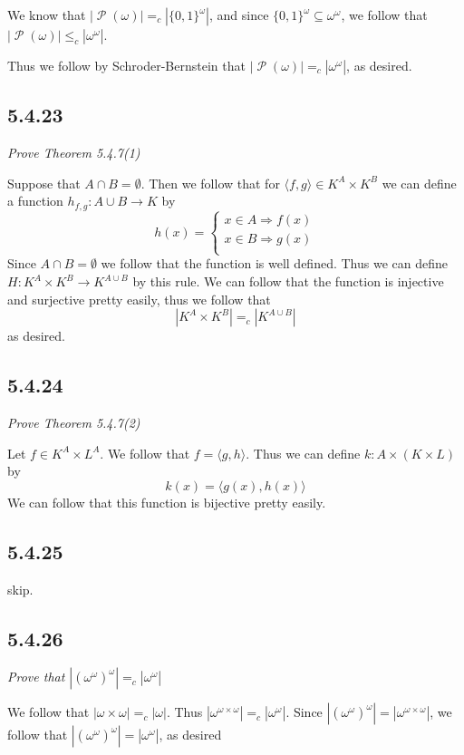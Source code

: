 \documentclass[11pt,oneside,titlepage]{book}
\DeclareMathOperator \pow {\mathcal {P}}
\DeclareMathOperator \ra {\Rightarrow}
\newcommand{\eangle}[1]{\langle #1 \rangle}
\begin{document}
We know that $|\pow(\omega)| =_c |\{0, 1\}^{\omega}|$, and since
$\{0, 1\}^{\omega} \subseteq \omega^\omega$, we follow that $|\pow(\omega)| \leq_c |\omega^\omega|$.

Thus we follow by Schroder-Bernstein that $|\pow(\omega)| =_c |\omega^\omega|$, as desired.

\subsection*{5.4.23}

\textit{Prove Theorem 5.4.7(1)}

Suppose that $A \cap B = \emptyset$. Then we follow that for $\eangle{f, g} \in K^A \times K^B$
we can define a function $h_{f, g}: A \cup B \to K$ by
$$
h(x) =
\begin{cases}
  x \in A \ra f(x) \\
  x \in B  \ra g(x) \\
\end{cases}
$$
Since $A \cap B = \emptyset$ we follow that the function is well defined.
Thus we can define $H: K^A \times K^B \to K^{A \cup B}$ by this rule.
We can follow that the function is injective and surjective pretty easily, thus we follow that
$$|K^A \times K^B| =_c |K^{A \cup B}|$$
as desired.

\subsection*{5.4.24}

\textit{Prove Theorem 5.4.7(2)}

Let $f \in K^A \times L^A$. We follow that $f = \eangle{g, h}$. Thus we can define
$k: A \times (K \times L)$ by
$$k(x) = \eangle{g(x), h(x)}$$
We can follow that this function is bijective pretty easily.

\subsection*{5.4.25}

skip.

\subsection*{5.4.26}

\textit{Prove that $|(\omega^\omega)^\omega| =_c |\omega^\omega|$}

We follow that $|\omega \times \omega| =_c |\omega|$. Thus
$|\omega^{\omega \times \omega}| =_c |\omega^\omega|$. Since
$|(\omega^\omega)^\omega|  = |\omega^{\omega \times \omega}|$, we follow that
$|(\omega^\omega)^\omega| = |\omega^\omega|$, as desired
\end{document}
